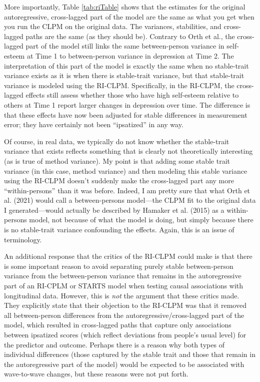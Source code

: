 \documentclass[
  english,
  man,floatsintext]{apa6}
\begin{document}
More importantly, Table \ref{tab:riTable} shows that the estimates for the original autoregressive, cross-lagged part of the model are the same as what you get when you run the CLPM on the original data. The variances, stabilities, and cross-lagged paths are the same (as they should be). Contrary to Orth et al., the cross-lagged part of the model still links the same between-person variance in self-esteem at Time 1 to between-person variance in depression at Time 2. The interpretation of this part of the model is exactly the same when no stable-trait variance exists as it is when there is stable-trait variance, but that stable-trait variance is modeled using the RI-CLPM. Specifically, in the RI-CLPM, the cross-lagged effects still assess whether those who have high self-esteem relative to others at Time 1 report larger changes in depression over time. The difference is that these effects have now been adjusted for stable differences in measurement error; they have certainly not been ``ipsatized'' in any way.

Of course, in real data, we typically do not know whether the stable-trait variance that exists reflects something that is clearly not theoretically interesting (as is true of method variance). My point is that adding some stable trait variance (in this case, method variance) and then modeling this stable variance using the RI-CLPM doesn't suddenly make the cross-lagged part any more ``within-persons'' than it was before. Indeed, I am pretty sure that what Orth et al. (2021) would call a between-persons model---the CLPM fit to the original data I generated---would actually be described by Hamaker et al. (2015) as a within-persons model, not because of what the model is doing, but simply because there is no stable-trait variance confounding the effects. Again, this is an issue of terminology.

An additional response that the critics of the RI-CLPM could make is that there is some important reason to avoid separating purely stable between-person variance from the between-person variance that remains in the autoregressive part of an RI-CPLM or STARTS model when testing causal associations with longitudinal data. However, this is \emph{not} the argument that these critics made. They explicitly state that their objection to the RI-CLPM was that it removed all between-person differences from the autoregressive/cross-lagged part of the model, which resulted in cross-lagged paths that capture only associations between ipsatized scores (which reflect deviations from people's usual level) for the predictor and outcome. Perhaps there is a reason why both types of individual differences (those captured by the stable trait and those that remain in the autoregressive part of the model) would be expected to be associated with wave-to-wave changes, but these reasons were not put forth.
\end{document}
